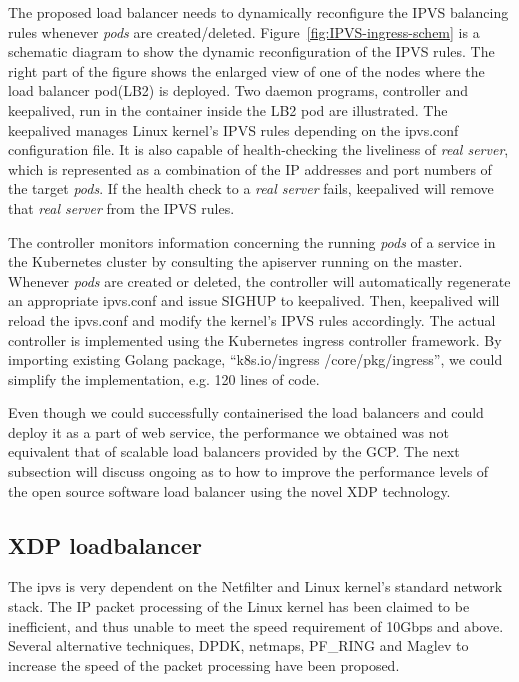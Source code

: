 The proposed load balancer needs to dynamically reconfigure the IPVS balancing rules whenever {\em pods} are created/deleted. 
Figure~\ref{fig:IPVS-ingress-schem} is a schematic diagram to show the dynamic reconfiguration of the IPVS rules.
The right part of the figure shows the enlarged view of one of the nodes where the load balancer pod(LB2) is deployed.
Two daemon programs, controller and keepalived, run in the container inside the LB2 pod are illustrated.
The keepalived manages Linux kernel's IPVS rules depending on the ipvs.conf configuration file.
It is also capable of health-checking the liveliness of {\em real server}, 
which is represented as a combination of the IP addresses and port numbers of the target {\em pods}. 
If the health check to a {\em real server} fails, keepalived will remove that {\em real server} from the IPVS rules.

The controller monitors information concerning the running {\em pods} of a service 
in the Kubernetes cluster by consulting the apiserver running on the master.
Whenever {\em pods} are created or deleted, the controller will automatically regenerate an appropriate ipvs.conf 
and issue SIGHUP to keepalived.
Then, keepalived will reload the ipvs.conf and modify the kernel's IPVS rules accordingly.
The actual controller\cite{ktaka_ccmp_2017_826894} is implemented using the Kubernetes ingress controller\cite{K8sIngress2017} framework. 
By importing existing Golang package, \enquote{k8s.io/ingress /core/pkg/ingress}, we could simplify the implementation, e.g. 
120 lines of code.  

Even though we could successfully containerised the load balancers and could deploy it as a part of web service,
the performance we obtained was not equivalent that of scalable load balancers provided by the GCP.
The next subsection will discuss ongoing as to how to improve the performance levels of the open source software load balancer using the novel XDP technology.

\subsection{XDP loadbalancer}\label{XDP loadbalancer}

The ipvs is very dependent on the Netfilter and Linux kernel's standard network stack.
The IP packet processing of the Linux kernel has been claimed to be inefficient, and thus unable to meet the speed requirement of 10Gbps and above.
Several alternative techniques, DPDK\cite{dpdkorg}, netmaps\cite{rizzo2012netmap}, PF\_RING\cite{deri2004improving} and Maglev\cite{eisenbud2016maglev} to increase the speed of the packet processing have been proposed.

